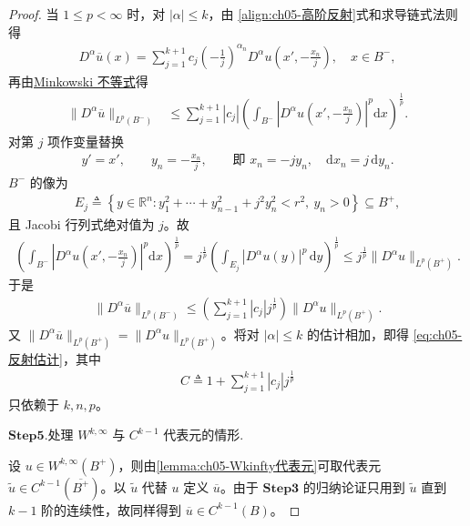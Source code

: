\documentclass[../../main.tex]{subfiles}
\begin{document}
\begin{proof}
当 $1\leqslant p<\infty$ 时，对 $|\alpha|\leqslant k$，由 \eqref{align:ch05-高阶反射}式和求导链式法则得
\begin{align}\label{HJKLVNLKAAA}
D^{\alpha}\overline{u}(x)=\sum_{j=1}^{k+1}c_j\left(-\frac{1}{j}\right)^{\alpha_n}
D^{\alpha}u\left(x',-\frac{x_n}{j}\right),\quad x\in B^{-},
\end{align}
再由\hyperref[Real Analysis-theorem:实变函数--Minkowski不等式]{Minkowski 不等式}得
\begin{align*}
\|D^{\alpha}\overline{u}\|_{L^{p}(B^{-})}
&\leqslant\sum_{j=1}^{k+1}|c_j|\left(\int_{B^{-}}\left|D^{\alpha}u\left(x',-\frac{x_n}{j}\right)\right|^{p}\mathrm{d}x\right)^{\frac{1}{p}}.
\end{align*}
对第 $j$ 项作变量替换
\begin{align*}
y'=x',\qquad y_n=-\frac{x_n}{j},\qquad\text{即 }x_n=-jy_n,\quad \mathrm{d}x_n=j\,\mathrm{d}y_n.
\end{align*}
$B^{-}$ 的像为
\begin{align*}
E_j\triangleq\left\{y\in\mathbb{R}^{n}:y_1^2+\cdots+y_{n-1}^2+j^2y_n^2<r^2,\ y_n>0\right\}\subseteq B^{+},
\end{align*}
且 Jacobi 行列式绝对值为 $j$。故
\begin{align*}
\left(\int_{B^{-}}\left|D^{\alpha}u\left(x',-\frac{x_n}{j}\right)\right|^{p}\mathrm{d}x\right)^{\frac{1}{p}}
=j^{\frac{1}{p}}\left(\int_{E_j}|D^{\alpha}u(y)|^{p}\,\mathrm{d}y\right)^{\frac{1}{p}}\leqslant j^{\frac{1}{p}}\|D^{\alpha}u\|_{L^{p}(B^{+})}.
\end{align*}
于是
\begin{align*}
\|D^{\alpha}\overline{u}\|_{L^{p}(B^{-})}
\leqslant\left(\sum_{j=1}^{k+1}|c_j|j^{\frac{1}{p}}\right)\|D^{\alpha}u\|_{L^{p}(B^{+})}.
\end{align*}
又 $\|D^{\alpha}\overline{u}\|_{L^{p}(B^{+})}=\|D^{\alpha}u\|_{L^{p}(B^{+})}$。将对 $|\alpha|\leqslant k$ 的估计相加，即得 \eqref{eq:ch05-反射估计}，其中
\begin{align*}
C\triangleq1+\sum_{j=1}^{k+1}|c_j|j^{\frac{1}{p}}
\end{align*}
只依赖于 $k,n,p$。

\noindent$\mathbf{Step}\bm{5}$.{\heiti 处理 $W^{k,\infty}$ 与 $C^{k-1}$ 代表元的情形.}

设 $u\in W^{k,\infty}(B^{+})$，则由\cref{lemma:ch05-Wkinfty代表元}可取代表元$\widetilde{u}\in C^{k-1}(\overline{B^{+}})$。以 $\widetilde{u}$ 代替 $u$ 定义 $\overline{u}$。由于 $\mathbf{Step}\bm{3}$ 的归纳论证只用到 $\widetilde{u}$ 直到 $k-1$ 阶的连续性，故同样得到 $\overline{u}\in C^{k-1}(B)$。


\end{proof}
\end{document}
